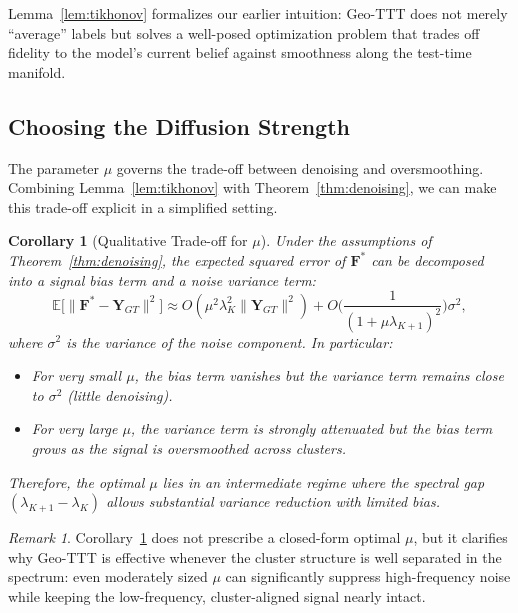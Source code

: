 \documentclass{article}
\theoremstyle{plain}
\newtheorem{corollary}[theorem]{Corollary}
\theoremstyle{definition}
\theoremstyle{remark}
\newtheorem{remark}[theorem]{Remark}
\newcommand{\F}{\mathbf{F}}        %
\newcommand{\Y}{\mathbf{Y}}        %
\begin{document}
Lemma~\ref{lem:tikhonov} formalizes our earlier intuition: Geo-TTT does not merely ``average'' labels but solves a well-posed optimization problem that trades off fidelity to the model's current belief against smoothness along the test-time manifold.

\subsection{Choosing the Diffusion Strength}
\label{sec:mu_tradeoff}

The parameter $\mu$ governs the trade-off between denoising and oversmoothing. Combining Lemma~\ref{lem:tikhonov} with Theorem~\ref{thm:denoising}, we can make this trade-off explicit in a simplified setting.

\begin{corollary}[Qualitative Trade-off for $\mu$]
\label{cor:mu_tradeoff}
Under the assumptions of Theorem~\ref{thm:denoising}, the expected squared error of $\F^*$ can be decomposed into a signal bias term and a noise variance term:
\begin{equation}
\mathbb{E}\big[\|\F^* - \Y_{GT}\|^2\big] \approx 
O(\mu^2 \lambda_K^2 \|\Y_{GT}\|^2) + O\Big(\frac{1}{(1 + \mu \lambda_{K+1})^2}\Big)\sigma^2,
\end{equation}
where $\sigma^2$ is the variance of the noise component. In particular:
\begin{itemize}
    \item For very small $\mu$, the bias term vanishes but the variance term remains close to $\sigma^2$ (little denoising).
    \item For very large $\mu$, the variance term is strongly attenuated but the bias term grows as the signal is oversmoothed across clusters.
\end{itemize}
Therefore, the optimal $\mu$ lies in an intermediate regime where the spectral gap $(\lambda_{K+1} - \lambda_K)$ allows substantial variance reduction with limited bias.
\end{corollary}

\begin{remark}
Corollary~\ref{cor:mu_tradeoff} does not prescribe a closed-form optimal $\mu$, but it clarifies why Geo-TTT is effective whenever the cluster structure is well separated in the spectrum: even moderately sized $\mu$ can significantly suppress high-frequency noise while keeping the low-frequency, cluster-aligned signal nearly intact.
\end{remark}
\end{document}

